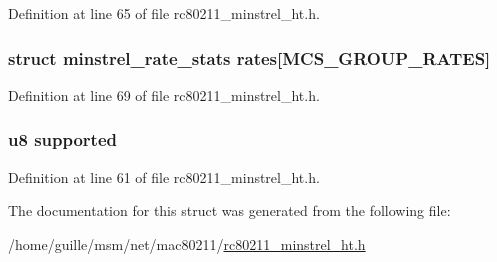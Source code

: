 Definition at line 65 of file rc80211\-\_\-minstrel\-\_\-ht.\-h.

\hypertarget{structminstrel__mcs__group__data_a4b803dc8a89936e90c219388274fec2b}{
\subsubsection[{rates}]{\setlength{\rightskip}{0pt plus 5cm}struct {\bf minstrel\-\_\-rate\-\_\-stats} rates\mbox{[}{\bf M\-C\-S\-\_\-\-G\-R\-O\-U\-P\-\_\-\-R\-A\-T\-E\-S}\mbox{]}}}\label{structminstrel__mcs__group__data_a4b803dc8a89936e90c219388274fec2b}


Definition at line 69 of file rc80211\-\_\-minstrel\-\_\-ht.\-h.

\hypertarget{structminstrel__mcs__group__data_ab33658d674b728098d19eee1209991a6}{
\subsubsection[{supported}]{\setlength{\rightskip}{0pt plus 5cm}u8 supported}}\label{structminstrel__mcs__group__data_ab33658d674b728098d19eee1209991a6}


Definition at line 61 of file rc80211\-\_\-minstrel\-\_\-ht.\-h.



The documentation for this struct was generated from the following file\-:\begin{DoxyCompactItemize}
\item 
/home/guille/msm/net/mac80211/\hyperlink{rc80211__minstrel__ht_8h}{rc80211\-\_\-minstrel\-\_\-ht.\-h}\end{DoxyCompactItemize}
